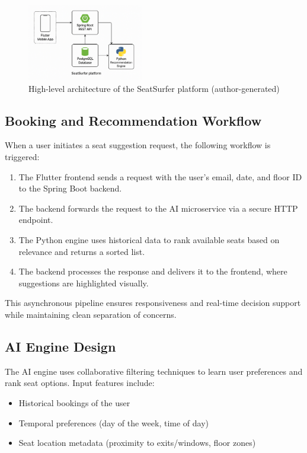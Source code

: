 \documentclass[onecolumn, 12pt]{IEEEtran}
\begin{document}
\begin{figure}[!ht]
\centering
\includegraphics[width=0.45\textwidth]{architecture_diagram.png}
\caption{High-level architecture of the SeatSurfer platform (author-generated)}
\label{fig:architecture}
\end{figure}

\subsection{Booking and Recommendation Workflow}

When a user initiates a seat suggestion request, the following workflow is triggered:

\begin{enumerate}
    \item The Flutter frontend sends a request with the user's email, date, and floor ID to the Spring Boot backend.
    \item The backend forwards the request to the AI microservice via a secure HTTP endpoint.
    \item The Python engine uses historical data to rank available seats based on relevance and returns a sorted list.
    \item The backend processes the response and delivers it to the frontend, where suggestions are highlighted visually.
\end{enumerate}

This asynchronous pipeline ensures responsiveness and real-time decision support while maintaining clean separation of concerns.

\subsection{AI Engine Design}

The AI engine uses collaborative filtering techniques to learn user preferences and rank seat options. Input features include:

\begin{itemize}
    \item Historical bookings of the user
    \item Temporal preferences (day of the week, time of day)
    \item Seat location metadata (proximity to exits/windows, floor zones)
\end{itemize}
\end{document}
